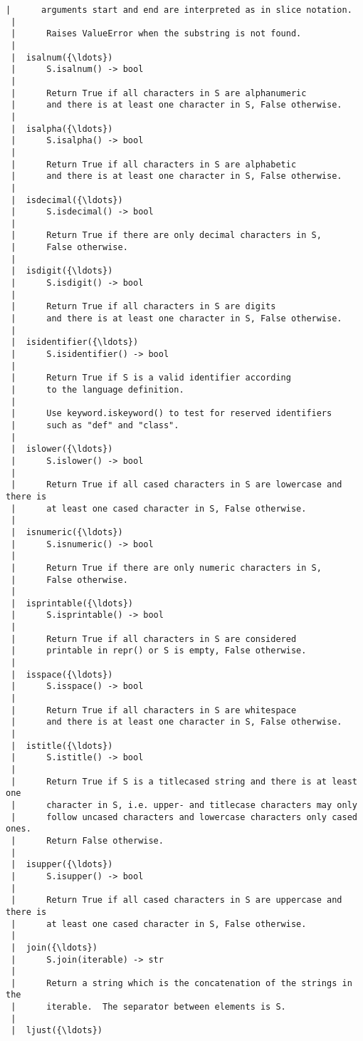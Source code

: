 \begin{Verbatim}[commandchars=\\\{\}]
 |      arguments start and end are interpreted as in slice notation.
 |      
 |      Raises ValueError when the substring is not found.
 |  
 |  isalnum({\ldots})
 |      S.isalnum() -> bool
 |      
 |      Return True if all characters in S are alphanumeric
 |      and there is at least one character in S, False otherwise.
 |  
 |  isalpha({\ldots})
 |      S.isalpha() -> bool
 |      
 |      Return True if all characters in S are alphabetic
 |      and there is at least one character in S, False otherwise.
 |  
 |  isdecimal({\ldots})
 |      S.isdecimal() -> bool
 |      
 |      Return True if there are only decimal characters in S,
 |      False otherwise.
 |  
 |  isdigit({\ldots})
 |      S.isdigit() -> bool
 |      
 |      Return True if all characters in S are digits
 |      and there is at least one character in S, False otherwise.
 |  
 |  isidentifier({\ldots})
 |      S.isidentifier() -> bool
 |      
 |      Return True if S is a valid identifier according
 |      to the language definition.
 |      
 |      Use keyword.iskeyword() to test for reserved identifiers
 |      such as "def" and "class".
 |  
 |  islower({\ldots})
 |      S.islower() -> bool
 |      
 |      Return True if all cased characters in S are lowercase and there is
 |      at least one cased character in S, False otherwise.
 |  
 |  isnumeric({\ldots})
 |      S.isnumeric() -> bool
 |      
 |      Return True if there are only numeric characters in S,
 |      False otherwise.
 |  
 |  isprintable({\ldots})
 |      S.isprintable() -> bool
 |      
 |      Return True if all characters in S are considered
 |      printable in repr() or S is empty, False otherwise.
 |  
 |  isspace({\ldots})
 |      S.isspace() -> bool
 |      
 |      Return True if all characters in S are whitespace
 |      and there is at least one character in S, False otherwise.
 |  
 |  istitle({\ldots})
 |      S.istitle() -> bool
 |      
 |      Return True if S is a titlecased string and there is at least one
 |      character in S, i.e. upper- and titlecase characters may only
 |      follow uncased characters and lowercase characters only cased ones.
 |      Return False otherwise.
 |  
 |  isupper({\ldots})
 |      S.isupper() -> bool
 |      
 |      Return True if all cased characters in S are uppercase and there is
 |      at least one cased character in S, False otherwise.
 |  
 |  join({\ldots})
 |      S.join(iterable) -> str
 |      
 |      Return a string which is the concatenation of the strings in the
 |      iterable.  The separator between elements is S.
 |  
 |  ljust({\ldots})

\end{Verbatim}
